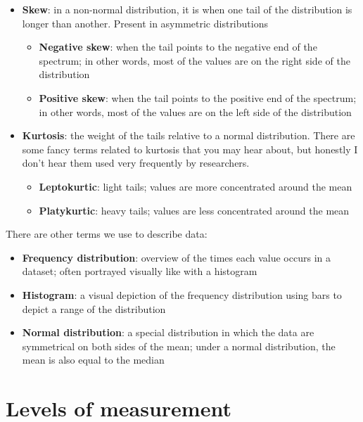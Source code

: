 \documentclass[
]{book}
\providecommand{\tightlist}{%
  \setlength{\itemsep}{0pt}\setlength{\parskip}{0pt}}
\begin{document}
\begin{itemize}
\item
  \textbf{Skew}: in a non-normal distribution, it is when one tail of the distribution is longer than another. Present in asymmetric distributions

  \begin{itemize}
  \item
    \textbf{Negative skew}: when the tail points to the negative end of the spectrum; in other words, most of the values are on the right side of the distribution
  \item
    \textbf{Positive skew}: when the tail points to the positive end of the spectrum; in other words, most of the values are on the left side of the distribution
  \end{itemize}
\item
  \textbf{Kurtosis}: the weight of the tails relative to a normal distribution. There are some fancy terms related to kurtosis that you may hear about, but honestly I don't hear them used very frequently by researchers.

  \begin{itemize}
  \tightlist
  \item
    \textbf{Leptokurtic}: light tails; values are more concentrated around the mean
  \item
    \textbf{Platykurtic}: heavy tails; values are less concentrated around the mean
  \end{itemize}
\end{itemize}

There are other terms we use to describe data:

\begin{itemize}
\item
  \textbf{Frequency distribution}: overview of the times each value occurs in a dataset; often portrayed visually like with a histogram
\item
  \textbf{Histogram}: a visual depiction of the frequency distribution using bars to depict a range of the distribution
\item
  \textbf{Normal distribution}: a special distribution in which the data are symmetrical on both sides of the mean; under a normal distribution, the mean is also equal to the median
\end{itemize}

\hypertarget{levels-of-measurement}{%
\section{Levels of measurement}\label{levels-of-measurement}}
\end{document}
